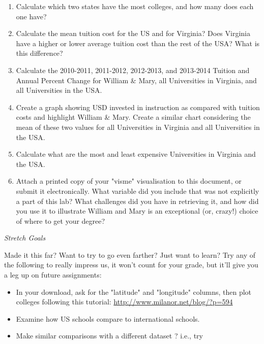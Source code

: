 \documentclass{article}
\begin{document}
{\begin{enumerate}[leftmargin=15mm]

\item Calculate which two states have the most colleges, and how many does each one have?

\item Calculate the mean tuition cost for the US and for Virginia?  Does Virginia have a higher or lower average tuition cost than the rest of the USA?  What is this difference?

\item Calculate the 2010-2011, 2011-2012, 2012-2013, and 2013-2014 Tuition and Annual Percent Change for William \& Mary, all Universities in Virginia, and all Universities in the USA.

\item Create a graph showing USD invested in instruction as compared with tuition costs and highlight William \& Mary.  Create a similar chart considering the mean of these two values for all Universities in Virginia and all Universities in the USA.

\item Calculate what are the most and least expensive Universities in Virginia and the USA. 

\item Attach a printed copy of your "visme" visualisation to this document, or submit it electronically.  What variable did you include that was not explicitly a part of this lab?  What challenges did you have in retrieving it, and how did you use it to illustrate William and Mary is an exceptional (or, crazy!) choice of where to get your degree?

\end{enumerate}


\vspace{4mm}
\setlength{\leftskip}{0cm}
\textit{Stretch Goals}

Made it this far?  Want to try to go even farther?  Just want to learn?  Try any of the following to really impress us, it won't count for your grade, but it'll give you a leg up on future assignments:
\begin{itemize}
\item In your download, ask for the "latitude" and "longitude" columns, then plot colleges following this tutorial: \url{http://www.milanor.net/blog/?p=594}
\item Examine how US schools compare to international schools.
\item Make similar comparisons with a different dataset ? i.e., try
\end{itemize}


}
\end{document}
